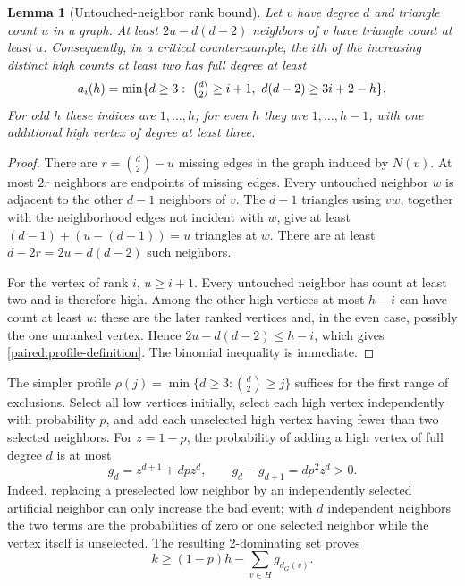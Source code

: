 \documentclass[11pt,a4paper]{article}
\newtheorem{lemma}[theorem]{Lemma}
\theoremstyle{definition}\newtheorem{definition}[theorem]{Definition}
\theoremstyle{remark}\newtheorem{remark}[theorem]{Remark}
\begin{document}
\begin{lemma}[Untouched-neighbor rank bound]\label{paired:rank}
Let $v$ have degree $d$ and triangle count $u$ in a graph. At least
$2u-d(d-2)$ neighbors of $v$ have triangle count at least $u$.
Consequently, in a critical counterexample, the $i$th of the increasing
distinct high counts at least two has full degree at least
\begin{equation}\label{paired:profile-definition}
 a_i(h)=\min\{d\ge3:\ \tbinom d2\ge i+1,
                    \ d(d-2)\ge3i+2-h\}.
\end{equation}
For odd $h$ these indices are $1,\ldots,h$; for even $h$ they are
$1,\ldots,h-1$, with one additional high vertex of degree at least three.
\end{lemma}
\begin{proof}
There are $r=\binom d2-u$ missing edges in the graph induced by
$N(v)$. At most $2r$ neighbors are endpoints of missing edges.
Every untouched neighbor $w$ is adjacent to the other $d-1$
neighbors of $v$. The $d-1$ triangles using $vw$, together with the
neighborhood edges not incident with $w$, give at least
$(d-1)+(u-(d-1))=u$ triangles at $w$. There are at least
$d-2r=2u-d(d-2)$ such neighbors.

For the vertex of rank $i$, $u\ge i+1$. Every untouched neighbor
has count at least two and is therefore high. Among the other high
vertices at most $h-i$ can have count at least $u$: these are the
later ranked vertices and, in the even case, possibly the one
unranked vertex. Hence $2u-d(d-2)\le h-i$, which gives
\eqref{paired:profile-definition}. The binomial inequality is immediate.
\end{proof}

The simpler profile $\rho(j)=\min\{d\ge3:\binom d2\ge j\}$ suffices
for the first range of exclusions. Select all low vertices initially,
select each high vertex independently with probability $p$, and add
each unselected high vertex having fewer than two selected neighbors.
For $z=1-p$, the probability of adding a high vertex of full degree
$d$ is at most
\begin{equation}\label{paired:g}
 g_d=z^{d+1}+dpz^d,
 \qquad g_d-g_{d+1}=dp^2z^d>0.
\end{equation}
Indeed, replacing a preselected low neighbor by an independently
selected artificial neighbor can only increase the bad event; with
$d$ independent neighbors the two terms are the probabilities of
zero or one selected neighbor while the vertex itself is unselected.
The resulting 2-dominating set proves
\begin{equation}\label{paired:independent-bound}
 k\ge (1-p)h-\sum_{v\in H}g_{d_G(v)}.
\end{equation}
\end{document}
